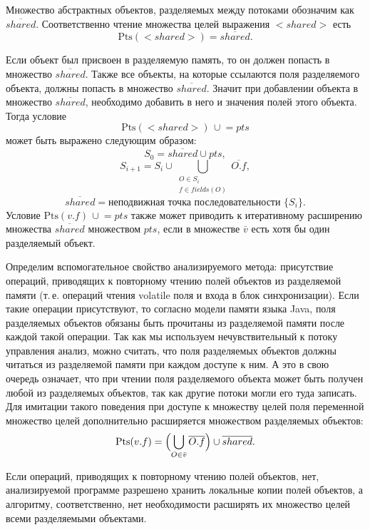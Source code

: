 \documentclass[14pt,titlepage]{extarticle}
\newcommand{\Pts}[1]{\textrm{Pts}(#1)}
\newcommand{\VPts}[1]{\bar{#1}}
\newcommand{\OFPts}[2]{\overline{#1.#2}}
\newcommand{\Shared}{\overline{shared}}
\newcommand{\cupe}{\,\cup\!\!=}
\newcommand{\eng}[1]{{\English#1}}
\newcommand{\java}{\eng{Java}\xspace}
\begin{document}
        Множество абстрактных объектов, разделяемых между потоками обозначим
        как $\Shared$. Соответственно чтение множества целей выражения
        ${<}shared{>}$ есть \[\Pts{{<}shared{>}} = \Shared.\]

        Если объект был присвоен в разделяемую память, то он должен попасть в
        множество $\Shared$. Также все объекты, на которые ссылаются поля
        разделяемого объекта, должны попасть в множество $\Shared$. Значит при
        добавлении объекта в множество $\Shared$, необходимо добавить в него и
        значения полей этого объекта. Тогда условие
        \[ \Pts{{<}shared{>}} \cupe pts \]
        может быть выражено следующим образом:
        \[ S_0 = \Shared \cup pts, \]
        \[ S_{i+1} = S_i \cup
           \bigcup_{\substack{O \in S_i\\ f \in fields(O)}} \OFPts{O}{f}, \]
        \[ \Shared = \text{неподвижная точка последовательности } \{S_i\}. \]
        Условие $\Pts{v.f} \cupe pts$ также может приводить к итеративному
        расширению множества $\Shared$ множеством $pts$, если в множестве
        $\VPts{v}$ есть хотя бы один разделяемый объект.

        Определим вспомогательное свойство анализируемого метода: присутствие
        операций, приводящих к повторному чтению полей объектов из разделяемой
        памяти (т.\,е. операций чтения \eng{volatile} поля и входа в блок
        синхронизации). Если такие операции присутствуют, то согласно модели
        памяти языка \java, поля разделяемых объектов обязаны быть прочитаны
        из разделяемой памяти после каждой такой операции. Так как мы
        используем нечувствительный к потоку управления анализ, можно считать,
        что поля разделяемых объектов должны читаться из разделяемой памяти при
        каждом доступе к ним. А это в свою очередь означает, что при чтении
        поля разделяемого объекта может быть получен любой из разделяемых
        объектов, так как другие потоки могли его туда записать.
        Для имитации такого поведения при доступе к множеству целей поля
        переменной множество целей дополнительно расширяется множеством
        разделяемых объектов:
        \[\Pts{v.f} = \Bigl(\bigcup\limits_{O \in \VPts{v}} \OFPts{O}{f} \Bigr)
                 \cup \Shared.\]

        Если операций, приводящих к повторному чтению полей объектов, нет,
        анализируемой программе разрешено хранить локальные копии полей
        объектов, а алгоритму, соответственно, нет необходимости расширять их
        множество целей всеми разделяемыми объектами.
\end{document}
